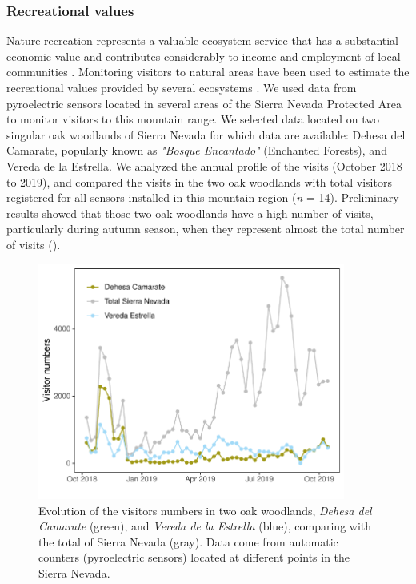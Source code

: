 \subsubsection{Recreational values}\label{sec:es:cultural-recreation}
Nature recreation represents a valuable ecosystem service that has a substantial economic value and contributes considerably to income and employment of local communities \autocites{Schagneretal2017MonitoringRecreation}. Monitoring visitors to natural areas have been used to estimate the recreational values provided by several ecosystems \autocites{Andersenetal2014MonitoringVisitors,Schagneretal2017MonitoringRecreation}. We used data from pyroelectric sensors located in several areas of the Sierra Nevada Protected Area to monitor visitors to this mountain range. We selected data located on two singular oak woodlands of Sierra Nevada for which data are available: Dehesa del Camarate, popularly known as \emph{"Bosque Encantado"} (Enchanted Forests), and Vereda de la Estrella. We analyzed the annual profile of the visits (October 2018 to 2019), and compared the visits in the two oak woodlands with total visitors registered for all sensors installed in this mountain region (\emph{n} = 14). Preliminary results showed that those two oak woodlands have a high number of visits, particularly during autumn season, when they represent almost the total number of visits (). 

\begin{figure}
    \centering
    \includegraphics[width=0.9\textwidth]{img/es/es-visitorsprofile.pdf}\caption{Evolution of the visitors numbers in two oak woodlands, \emph{Dehesa del Camarate} (green), and \emph{Vereda de la Estrella} (blue), comparing with the total of Sierra Nevada (gray). Data come from automatic counters (pyroelectric sensors) located at different points in the Sierra Nevada.}\label{fig:es:visitorsprofile}
\end{figure}

